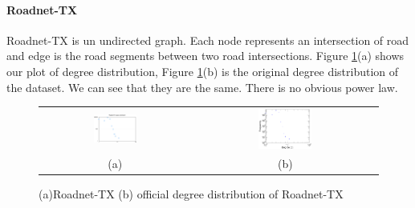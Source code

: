 \paragraph{Roadnet-TX}
Roadnet-TX is un undirected graph. Each node represents an intersection of road and edge is the road segments between two road intersections. Figure \ref{t1:tx}(a) shows our plot of degree distribution, Figure \ref{t1:tx}(b) is the original degree distribution of the dataset. We can see that they are the same. There is no obvious power law.
\begin{figure}[!htbf]
\begin{center}
\begin{tabular}{c c}
     \includegraphics[width=0.3\textwidth]{FIG/t1_tx.png} & 
     \includegraphics[width=0.3\textwidth]{FIG/t1_tx_truth.png}\\
    (a) & (b)\\
\end{tabular}
\caption{(a)Roadnet-TX (b) official degree distribution of Roadnet-TX}
\label{t1:tx}
\end{center}
\end{figure}


